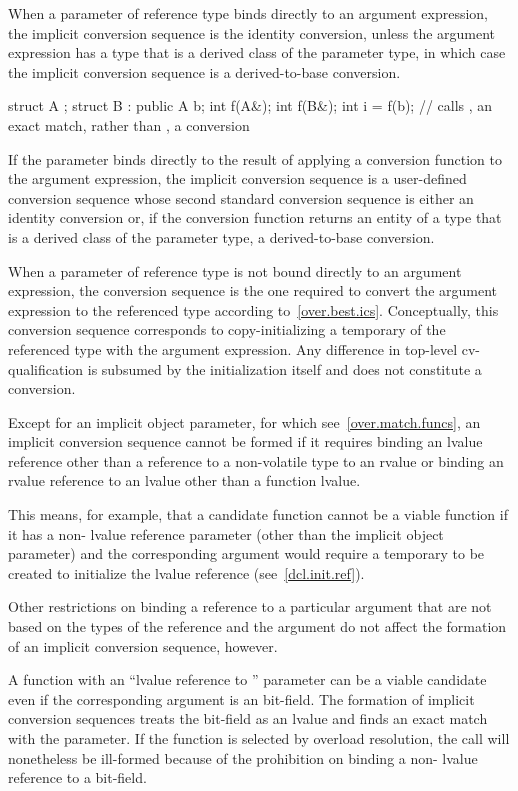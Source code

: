 \pnum
When a parameter of reference type binds directly to an
argument expression, the implicit conversion sequence is the identity conversion,
unless the argument expression has a type that is a derived class of the parameter
type, in which case the implicit conversion sequence is a derived-to-base
conversion.
\begin{example}
\begin{codeblock}
struct A {};
struct B : public A {} b;
int f(A&);
int f(B&);
int i = f(b);       // calls , an exact match, rather than , a conversion
\end{codeblock}
\end{example}
If the parameter binds directly to the result of
applying a conversion function to the argument expression, the implicit
conversion sequence is a user-defined conversion sequence
whose second standard conversion sequence is either an identity conversion or,
if the conversion function returns an entity of a type that is a derived class
of the parameter type, a derived-to-base conversion.

\pnum
When a parameter of reference type is not bound directly to an argument
expression, the conversion sequence is the one required to convert the argument
expression to the referenced type according to~\ref{over.best.ics}.
Conceptually, this conversion sequence corresponds to copy-initializing a
temporary of the referenced type with the argument expression.
Any difference
in top-level cv-qualification is subsumed by the initialization itself and
does not constitute a conversion.

\pnum
Except for an implicit object parameter, for which see~\ref{over.match.funcs},
an implicit conversion sequence cannot be formed if it requires
binding an lvalue reference
other than a reference to a non-volatile  type
to an rvalue
or binding an rvalue reference to an lvalue other than a function lvalue.
\begin{note}
This means, for example, that a candidate function cannot be a viable
function if it has a non- lvalue reference parameter (other than
the implicit object parameter) and the corresponding argument
would require a temporary to be created to initialize the lvalue
reference (see~\ref{dcl.init.ref}).
\end{note}

\pnum
Other restrictions on binding a reference to a particular argument
that are not based on the types of the reference and the argument
do not affect the formation of an implicit conversion
sequence, however.
\begin{example}
A function with an ``lvalue reference to '' parameter can
be a viable candidate even if the corresponding argument is an
bit-field.
The formation of implicit conversion sequences
treats the
bit-field as an
lvalue and finds an exact
match with the parameter.
If the function is selected by overload
resolution, the call will nonetheless be ill-formed because of
the prohibition on binding a non- lvalue reference to a bit-field.
\end{example}

